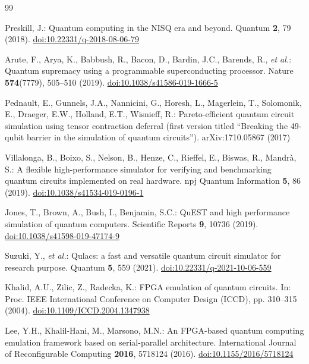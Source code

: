 \documentclass[pdflatex,sn-mathphys-num]{sn-jnl}
\providecommand{\doi}[1]{\href{https://doi.org/#1}{doi:#1}}
\theoremstyle{thmstyleone}
\theoremstyle{thmstylethree}
\begin{document}
\begin{thebibliography}{99}

Preskill, J.: Quantum computing in the NISQ era and beyond. Quantum \textbf{2}, 79 (2018). \doi{10.22331/q-2018-08-06-79}

Arute, F., Arya, K., Babbush, R., Bacon, D., Bardin, J.C., Barends, R., \emph{et al.}: Quantum supremacy using a programmable superconducting processor. Nature \textbf{574}(7779), 505--510 (2019). \doi{10.1038/s41586-019-1666-5}

Pednault, E., Gunnels, J.A., Nannicini, G., Horesh, L., Magerlein, T., Solomonik, E., Draeger, E.W., Holland, E.T., Wisnieff, R.: Pareto-efficient quantum circuit simulation using tensor contraction deferral (first version titled ``Breaking the 49-qubit barrier in the simulation of quantum circuits''). arXiv:1710.05867 (2017)

Villalonga, B., Boixo, S., Nelson, B., Henze, C., Rieffel, E., Biswas, R., Mandr\`a, S.: A flexible high-performance simulator for verifying and benchmarking quantum circuits implemented on real hardware. npj Quantum Information \textbf{5}, 86 (2019). \doi{10.1038/s41534-019-0196-1}

Jones, T., Brown, A., Bush, I., Benjamin, S.C.: QuEST and high performance simulation of quantum computers. Scientific Reports \textbf{9}, 10736 (2019). \doi{10.1038/s41598-019-47174-9}

Suzuki, Y., \emph{et al.}: Qulacs: a fast and versatile quantum circuit simulator for research purpose. Quantum \textbf{5}, 559 (2021). \doi{10.22331/q-2021-10-06-559}

Khalid, A.U., Zilic, Z., Radecka, K.: FPGA emulation of quantum circuits. In: Proc. IEEE International Conference on Computer Design (ICCD), pp. 310--315 (2004). \doi{10.1109/ICCD.2004.1347938}

Lee, Y.H., Khalil-Hani, M., Marsono, M.N.: An FPGA-based quantum computing emulation framework based on serial-parallel architecture. International Journal of Reconfigurable Computing \textbf{2016}, 5718124 (2016). \doi{10.1155/2016/5718124}


\end{thebibliography}
\end{document}
